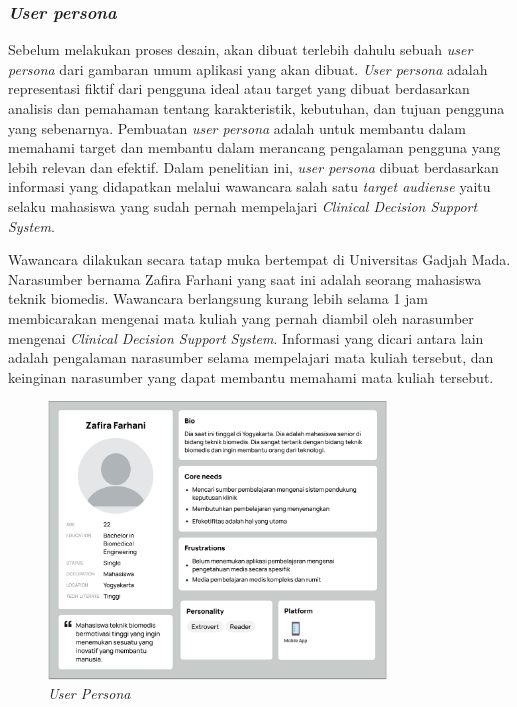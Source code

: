 \subsubsection{\textit{User persona}}
Sebelum melakukan proses desain, akan dibuat terlebih dahulu sebuah \textit{user persona} dari gambaran umum aplikasi yang akan dibuat.
\textit{User persona} adalah representasi fiktif dari pengguna ideal atau target yang dibuat berdasarkan analisis dan pemahaman tentang karakteristik, kebutuhan, dan tujuan pengguna yang sebenarnya. 
Pembuatan \textit{user persona} adalah untuk membantu dalam memahami target dan membantu dalam merancang pengalaman pengguna yang lebih relevan dan efektif.
Dalam penelitian ini, \textit{user persona} dibuat berdasarkan informasi yang didapatkan melalui wawancara salah satu \textit{target audiense} yaitu selaku mahasiswa yang sudah pernah mempelajari \textit{Clinical Decision Support System}.

Wawancara dilakukan secara tatap muka bertempat di Universitas Gadjah Mada. Narasumber bernama Zafira Farhani yang saat ini adalah seorang mahasiswa teknik biomedis.
Wawancara berlangsung kurang lebih selama 1 jam membicarakan mengenai mata kuliah yang pernah diambil oleh narasumber mengenai \textit{Clinical Decision Support System}.
Informasi yang dicari antara lain adalah pengalaman narasumber selama mempelajari mata kuliah tersebut, dan keinginan narasumber yang dapat membantu memahami mata kuliah tersebut.

\begin{figure}[H]
	\centering
	\includegraphics[width=0.8\textwidth]{contents/chapter-3/images/up-dummy.png}
	\caption{\textit{User Persona}}
	\label{Fig:UserPersona}
\end{figure}

